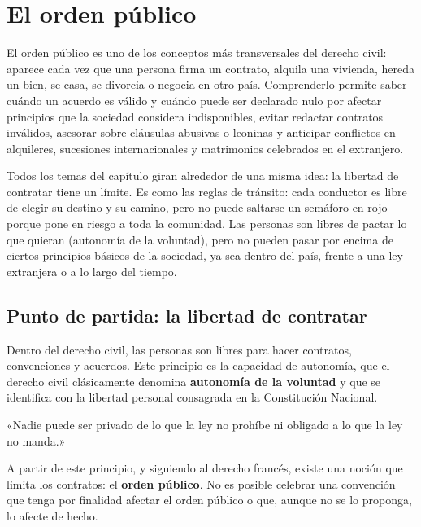 \documentclass[12pt,oneside]{book}
\begin{document}
\chapter{El orden público}
\label{cap:op}

El orden público es uno de los conceptos más transversales del derecho civil: aparece cada vez que una persona firma un contrato, alquila una vivienda, hereda un bien, se casa, se divorcia o negocia en otro país. Comprenderlo permite saber cuándo un acuerdo es válido y cuándo puede ser declarado nulo por afectar principios que la sociedad considera indisponibles, evitar redactar contratos inválidos, asesorar sobre cláusulas abusivas o leoninas y anticipar conflictos en alquileres, sucesiones internacionales y matrimonios celebrados en el extranjero.

Todos los temas del capítulo giran alrededor de una misma idea: la libertad de contratar tiene un límite. Es como las reglas de tránsito: cada conductor es libre de elegir su destino y su camino, pero no puede saltarse un semáforo en rojo porque pone en riesgo a toda la comunidad. Las personas son libres de pactar lo que quieran (autonomía de la voluntad), pero no pueden pasar por encima de ciertos principios básicos de la sociedad, ya sea dentro del país, frente a una ley extranjera o a lo largo del tiempo.

\section{Punto de partida: la libertad de contratar}

Dentro del derecho civil, las personas son libres para hacer contratos, convenciones y acuerdos. Este principio es la capacidad de autonomía, que el derecho civil clásicamente denomina \textbf{autonomía de la voluntad} y que se identifica con la libertad personal consagrada en la Constitución Nacional.

\begin{regla}
«Nadie puede ser privado de lo que la ley no prohíbe ni obligado a lo que la ley no manda.»
\end{regla}

A partir de este principio, y siguiendo al derecho francés, existe una noción que limita los contratos: el \textbf{orden público}. No es posible celebrar una convención que tenga por finalidad afectar el orden público o que, aunque no se lo proponga, lo afecte de hecho.
\end{document}
